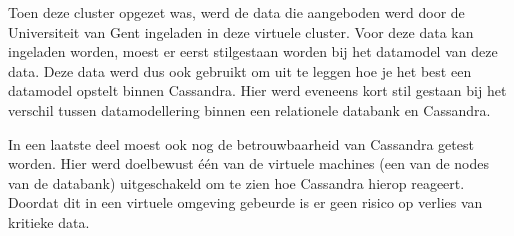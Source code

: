Toen deze cluster opgezet was, werd de data die aangeboden werd door de Universiteit van Gent ingeladen in deze virtuele cluster.
Voor deze data kan ingeladen worden, moest er eerst stilgestaan worden bij het datamodel van deze data.
Deze data werd dus ook gebruikt om uit te leggen hoe je het best een datamodel opstelt binnen Cassandra.
Hier werd eveneens kort stil gestaan bij het verschil tussen datamodellering binnen een relationele databank en Cassandra. 

In een laatste deel moest ook nog de betrouwbaarheid van Cassandra getest worden.
Hier werd doelbewust één van de virtuele machines (een van de nodes van de databank) uitgeschakeld om te zien hoe Cassandra hierop reageert.
Doordat dit in een virtuele omgeving gebeurde is er geen risico op verlies van kritieke data.